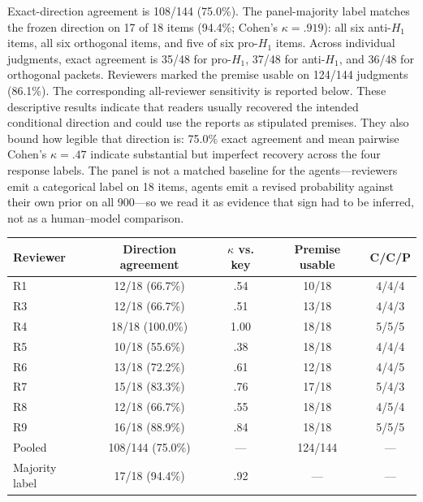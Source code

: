Exact-direction agreement is 108/144 (75.0\%). The panel-majority label matches
the frozen direction on 17 of 18 items (94.4\%; Cohen's $\kappa=.919$): all six
anti-$H_1$ items, all six orthogonal items, and five of six pro-$H_1$ items.
Across individual judgments, exact agreement is 35/48 for pro-$H_1$, 37/48 for
anti-$H_1$, and 36/48 for orthogonal packets. Reviewers marked the premise usable
on 124/144 judgments (86.1\%). The corresponding all-reviewer sensitivity is
reported below. These descriptive results indicate that readers usually recovered
the intended conditional direction and could use the reports as stipulated premises.
They also bound how legible that direction is: 75.0\% exact agreement and mean
pairwise Cohen's $\kappa=.47$ indicate substantial but imperfect recovery across
the four response labels. The panel is not a matched baseline for the agents---reviewers
emit a categorical label on 18 items, agents emit a revised probability against
their own prior on all 900---so we read it as evidence that sign had to be
inferred, not as a human--model comparison.
\begin{center}
\begin{minipage}{\linewidth}
\centering
\small
{}
\label{tab:stage3-human}
\begin{tabular}{lcccc}
\toprule
Reviewer & Direction agreement & $\kappa$ vs. key & Premise usable & C/C/P \\
\midrule
R1 & 12/18 (66.7\%) & .54 & 10/18 & 4/4/4 \\
R3 & 12/18 (66.7\%) & .51 & 13/18 & 4/4/3 \\
R4 & 18/18 (100.0\%) & 1.00 & 18/18 & 5/5/5 \\
R5 & 10/18 (55.6\%) & .38 & 18/18 & 4/4/4 \\
R6 & 13/18 (72.2\%) & .61 & 12/18 & 4/4/5 \\
R7 & 15/18 (83.3\%) & .76 & 17/18 & 5/4/3 \\
R8 & 12/18 (66.7\%) & .55 & 18/18 & 4/5/4 \\
R9 & 16/18 (88.9\%) & .84 & 18/18 & 5/5/5 \\
\midrule
Pooled & 108/144 (75.0\%) & --- & 124/144 & --- \\
Majority label & 17/18 (94.4\%) & .92 & --- & --- \\
\bottomrule
\end{tabular}
\end{minipage}
\end{center}

